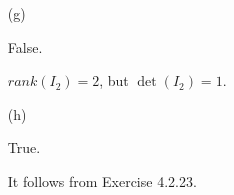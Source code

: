 \begin{Exercise}
\begin{enumerate}[(a)]
\item[(g)]
\begin{answer}
False.
\end{answer}
\begin{solution}
$rank(I_2) = 2$, but $\det(I_2) = 1$.
\end{solution}

\item[(h)]
\begin{answer}
True.
\end{answer}
\begin{solution}
It follows from Exercise 4.2.23.
\end{solution}

\end{enumerate}
\end{Exercise}